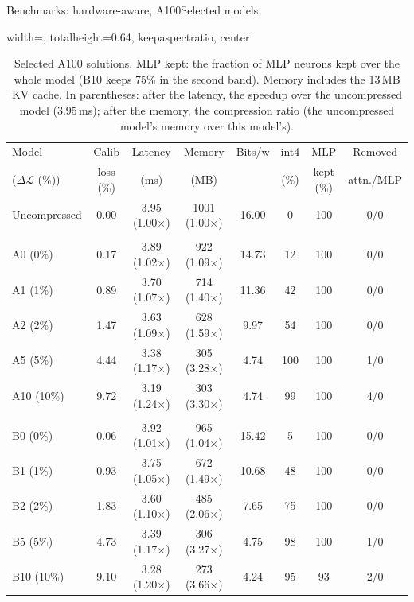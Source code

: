 \documentclass[aspectratio=169,10pt]{beamer}
\newcommand{\dloss}{\Delta\mathcal{L}}
\begin{document}
\begin{frame}{Benchmarks: hardware-aware, A100}{Selected models}
\begin{table}
\centering
\begin{adjustbox}{width=\linewidth, totalheight=0.64\textheight, keepaspectratio, center}
\centering
\scriptsize
\setlength{\tabcolsep}{3pt}
\begin{tabular}{lccccccc}
\toprule
Model & Calib & Latency & Memory & Bits/w & int4 & MLP & Removed \\
($\dloss$ (\%)) & loss (\%) & (ms) & (MB) & & (\%) & kept (\%) & attn./MLP \\
\midrule
Uncompressed & 0.00 & 3.95 (1.00$\times$) & 1001 (1.00$\times$) & 16.00 & 0 & 100 & 0/0 \\
\addlinespace
\multicolumn{8}{l}{\emph{2 objectives}} \\
A0  (0\%)  & 0.17 & 3.89 (1.02$\times$) & 922 (1.09$\times$) & 14.73 & 12  & 100 & 0/0 \\
A1  (1\%)  & 0.89 & 3.70 (1.07$\times$) & 714 (1.40$\times$) & 11.36 & 42  & 100 & 0/0 \\
A2  (2\%)  & 1.47 & 3.63 (1.09$\times$) & 628 (1.59$\times$) & 9.97  & 54  & 100 & 0/0 \\
A5  (5\%)  & 4.44 & 3.38 (1.17$\times$) & 305 (3.28$\times$) & 4.74  & 100 & 100 & 1/0 \\
A10 (10\%) & 9.72 & 3.19 (1.24$\times$) & 303 (3.30$\times$) & 4.74  & 99  & 100 & 4/0 \\
\addlinespace
\multicolumn{8}{l}{\emph{3 objectives}} \\
B0  (0\%)  & 0.06 & 3.92 (1.01$\times$) & 965 (1.04$\times$) & 15.42 & 5   & 100 & 0/0 \\
B1  (1\%)  & 0.93 & 3.75 (1.05$\times$) & 672 (1.49$\times$) & 10.68 & 48  & 100 & 0/0 \\
B2  (2\%)  & 1.83 & 3.60 (1.10$\times$) & 485 (2.06$\times$) & 7.65  & 75  & 100 & 0/0 \\
B5  (5\%)  & 4.73 & 3.39 (1.17$\times$) & 306 (3.27$\times$) & 4.75  & 98  & 100 & 1/0 \\
B10 (10\%) & 9.10 & 3.28 (1.20$\times$) & 273 (3.66$\times$) & 4.24  & 95  & 93  & 2/0 \\
\bottomrule
\end{tabular}
\end{adjustbox}
\caption{Selected A100 solutions. MLP kept: the fraction of MLP neurons kept over the whole model (B10
keeps 75\% in the second band). Memory includes the 13\,MB KV cache. In parentheses: after the latency, the
speedup over the uncompressed model (3.95\,ms); after the memory, the compression ratio (the uncompressed
model's memory over this model's).}\label{tab:a100models}
\end{table}
\end{frame}
\end{document}
